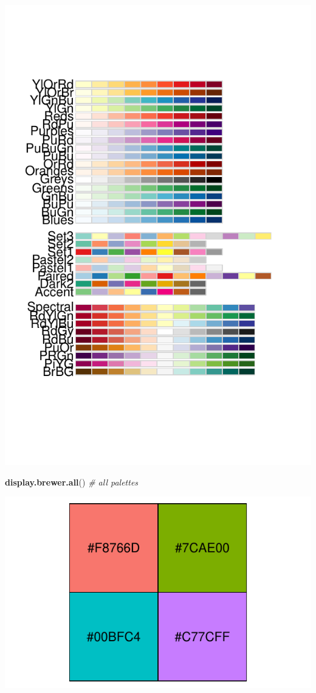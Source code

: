 \documentclass[]{tufte-handout}
\newenvironment{Shaded}{\begin{snugshade}}{\end{snugshade}}
\newcommand{\CommentTok}[1]{\textcolor[rgb]{0.56,0.35,0.01}{\textit{#1}}}
\newcommand{\KeywordTok}[1]{\textcolor[rgb]{0.13,0.29,0.53}{\textbf{#1}}}
\newcommand{\NormalTok}[1]{#1}
\begin{document}
\begin{marginfigure}
\includegraphics{design_files/figure-latex/unnamed-chunk-5-1} \end{marginfigure}

\begin{Shaded}
\begin{Highlighting}[]
\KeywordTok{display.brewer.all}\NormalTok{()  }\CommentTok{# all palettes}
\end{Highlighting}
\end{Shaded}

\includegraphics{design_files/figure-latex/unnamed-chunk-6-1}
\end{document}
